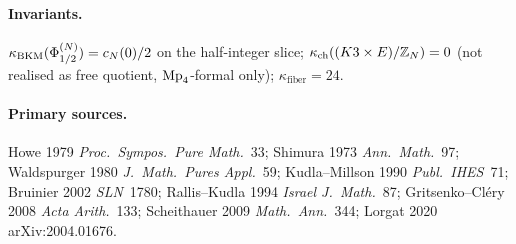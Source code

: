\paragraph{Invariants.} $\kappa_{\mathrm{BKM}}(\Phi^{(N)}_{1/2}) = c_N(0)/2$ on the
half-integer slice; $\kappa_{\mathrm{ch}}((K3\times E)/\mathbb{Z}_N) = 0$ (not realised as
free quotient, $\mathrm{Mp}_4$-formal only); $\kappa_{\mathrm{fiber}} = 24$.

\paragraph{Primary sources.}
Howe 1979 \emph{Proc.\ Sympos.\ Pure Math.}~33;
Shimura 1973 \emph{Ann.\ Math.}~97;
Waldspurger 1980 \emph{J.\ Math.\ Pures Appl.}~59;
Kudla--Millson 1990 \emph{Publ.\ IHES}~71;
Bruinier 2002 \emph{SLN}~1780;
Rallis--Kudla 1994 \emph{Israel J.\ Math.}~87;
Gritsenko--Cl\'ery 2008 \emph{Acta Arith.}~133;
Scheithauer 2009 \emph{Math.\ Ann.}~344;
Lorgat 2020 arXiv:2004.01676.
